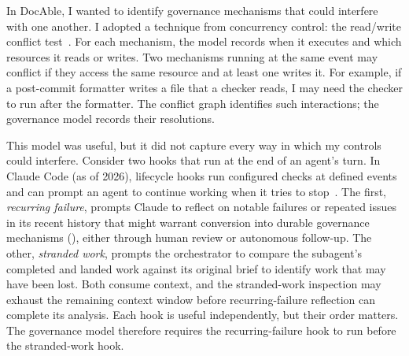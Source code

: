 


In DocAble, I wanted to identify governance mechanisms that could interfere with one another. I adopted a technique from concurrency control: the read/write conflict test~\citep{bernstein1981concurrency}. For each mechanism, the model records when it executes and which resources it reads or writes. Two mechanisms running at the same event may conflict if they access the same resource and at least one writes it. For example, if a post-commit formatter writes a file that a checker reads, I may need the checker to run after the formatter. The conflict graph identifies such interactions; the governance model records their resolutions.


This model was useful, but it did not capture every way in which my controls could interfere. Consider two hooks that run at the end of an agent's turn. In Claude Code (as of 2026), lifecycle hooks run configured checks at defined events and can prompt an agent to continue working when it tries to stop~\citep{anthropic2026claudecodehooks}. The first, \emph{recurring failure}, prompts Claude to reflect on notable failures or repeated issues in its recent history that might warrant conversion into durable governance mechanisms (), either through human review or autonomous follow-up. The other, \emph{stranded work}, prompts the orchestrator to compare the subagent's completed and landed work against its original brief to identify work that may have been lost. Both consume context, and the stranded-work inspection may exhaust the remaining context window before recurring-failure reflection can complete its analysis. Each hook is useful independently, but their order matters. The governance model therefore requires the recurring-failure hook to run before the stranded-work hook.

